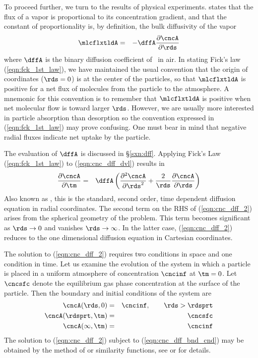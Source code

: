 \documentclass[12pt,twoside]{book}
\begin{document}
To proceed further, we turn to the results of physical experiments.
 states that the flux of a vapor is
proportional to its concentration gradient, and that the constant of
proportionality is, by definition, the bulk diffusivity of the vapor 
\begin{eqnarray}
\mlcflxtldA & = & - \dffA \frac{\partial \cncA}{\partial \rds }
\label{eqn:fck_1st_law}
\end{eqnarray}
where $\dffA$ is the binary diffusion coefficient of \A\ in air.
In stating Fick's law (\ref{eqn:fck_1st_law}), we have maintained the 
usual convention that the origin of coordinates ($\rds = 0$) is at the
center of the particles, so that $\mlcflxtldA$ is positive for
a net flux of molecules from the particle to the atmosphere. 
A mnemonic for this convention is to remember that $\mlcflxtldA$ is
positive when net molecular flow is toward larger $\rds$.
However, we are usually more interested in particle absorption than
desorption so the convention expressed in (\ref{eqn:fck_1st_law}) may 
prove confusing.
One must bear in mind that negative radial fluxes indicate net
uptake by the particle.

The evaluation of $\dffA$ is discussed in \S\ref{sxn:dff}.
Applying Fick's Law (\ref{eqn:fck_1st_law}) to (\ref{eqn:cnc_dff_dvl}) 
results in
\begin{eqnarray}
\frac{\partial \cncA}{\partial \tm }  & = & \dffA \left(
\frac{\partial^{2} \cncA}{\partial \rds^{2} } + \frac{2}{\rds }
\frac{\partial \cncA}{\partial \rds } \right)
\label{eqn:cnc_dff_2}
\end{eqnarray}
Also known as , this is the standard, second
order, time dependent diffusion equation in radial coordinates.
The second term on the RHS of (\ref{eqn:cnc_dff_2}) arises from the
spherical geometry of the problem.
This term becomes significant as $\rds \rightarrow 0$ and vanishes
$\rds \rightarrow \infty$.
In the latter case, (\ref{eqn:cnc_dff_2}) reduces to the one
dimensional diffusion equation in Cartesian coordinates.

The solution to (\ref{eqn:cnc_dff_2}) requires two conditions in
space and one condition in time.
Let us examine the evolution of the system in which a particle is
placed in a uniform atmosphere of concentration $\cncinf$ at $\tm 
= 0$.
Let $\cncsfc$ denote the equilibrium gas phase concentration at the
surface of the particle. 
Then the boundary and initial conditions of the system are
\begin{eqnarray}
\cncA ( \rds, 0 ) & = & \cncinf, \qquad \rds > \rdsprt \\
\label{eqn:cnc_dff_bnd_cnd}
\cncA ( \rdsprt, \tm ) & = & \cncsfc \\
\cncA ( \infty, \tm ) & = & \cncinf
\end{eqnarray}
The solution to (\ref{eqn:cnc_dff_2}) subject to
(\ref{eqn:cnc_dff_bnd_cnd}) may be obtained by the method of 
 or similarity functions, see
\cite{SeP97} or \cite{PrK98} for details. 
\end{document}
